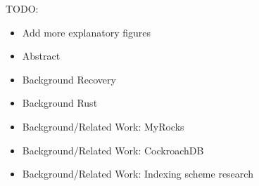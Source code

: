 \color{purple}
TODO:
\begin{itemize}
  \item Add more explanatory figures

  \item Abstract

  \item Background Recovery
  \item Background Rust

  \item Background/Related Work: MyRocks
  \item Background/Related Work: CockroachDB
  \item Background/Related Work: Indexing scheme research
\end{itemize}

